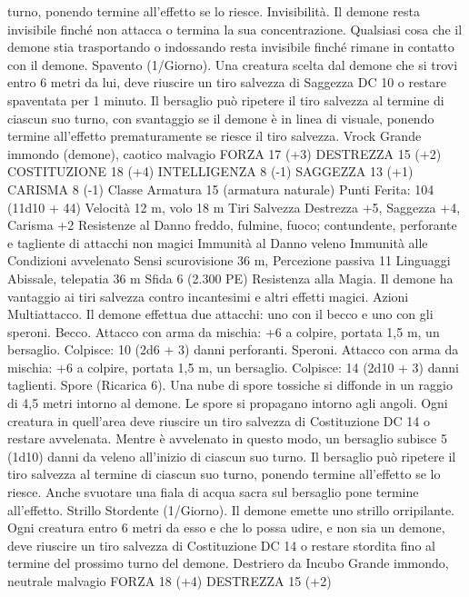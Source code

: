 \begin{multicols}{2}
turno, ponendo termine all’effetto se lo riesce.
Invisibilità. Il demone resta invisibile finché non attacca o
termina la sua concentrazione. Qualsiasi cosa che il demone stia
trasportando o indossando resta invisibile finché rimane in
contatto con il demone.
Spavento (1/Giorno). Una creatura scelta dal demone che si trovi
entro 6 metri da lui, deve riuscire un tiro salvezza di Saggezza
DC 10 o restare spaventata per 1 minuto. Il bersaglio può ripetere
il tiro salvezza al termine di ciascun suo turno, con svantaggio se
il demone è in linea di visuale, ponendo termine all’effetto
prematuramente se riesce il tiro salvezza.
Vrock
Grande immondo (demone), caotico malvagio
FORZA 17 (+3)
DESTREZZA 15 (+2)
COSTITUZIONE 18 (+4)
INTELLIGENZA 8 (-1)
SAGGEZZA 13 (+1)
CARISMA 8 (-1)
Classe Armatura 15 (armatura naturale)
\hspace*{0pt}\hfill{Punti Ferita}: 104 (11d10 + 44)
Velocità 12 m, volo 18 m
Tiri Salvezza Destrezza +5, Saggezza +4, Carisma +2
Resistenze al Danno freddo, fulmine, fuoco; contundente,
perforante e tagliente di attacchi non magici
Immunità al Danno veleno
Immunità alle Condizioni avvelenato
Sensi scurovisione 36 m, Percezione passiva 11
Linguaggi Abissale, telepatia 36 m
Sfida 6 (2.300 PE)
Resistenza alla Magia. Il demone ha vantaggio ai tiri salvezza
contro incantesimi e altri effetti magici.
Azioni
Multiattacco. Il demone effettua due attacchi: uno con il becco e
uno con gli speroni.
Becco. Attacco con arma da mischia: +6 a colpire, portata 1,5 m,
un bersaglio.
Colpisce: 10 (2d6 + 3) danni perforanti.
Speroni. Attacco con arma da mischia: +6 a colpire, portata 1,5
m, un bersaglio.
Colpisce: 14 (2d10 + 3) danni taglienti.
Spore (Ricarica 6). Una nube di spore tossiche si diffonde in un
raggio di 4,5 metri intorno al demone. Le spore si propagano
intorno agli angoli. Ogni creatura in quell’area deve riuscire un
tiro salvezza di Costituzione DC 14 o restare avvelenata. Mentre
è avvelenato in questo modo, un bersaglio subisce 5 (1d10) danni
da veleno all’inizio di ciascun suo turno. Il bersaglio può ripetere
il tiro salvezza al termine di ciascun suo turno, ponendo termine
all’effetto se lo riesce. Anche svuotare una fiala di acqua sacra
sul bersaglio pone termine all’effetto.
Strillo Stordente (1/Giorno). Il demone emette uno strillo
orripilante. Ogni creatura entro 6 metri da esso e che lo possa
udire, e non sia un demone, deve riuscire un tiro salvezza di
Costituzione DC 14 o restare stordita fino al termine del
prossimo turno del demone.
Destriero da Incubo
Grande immondo, neutrale malvagio
FORZA 18 (+4)
DESTREZZA 15 (+2)

\end{multicols}
